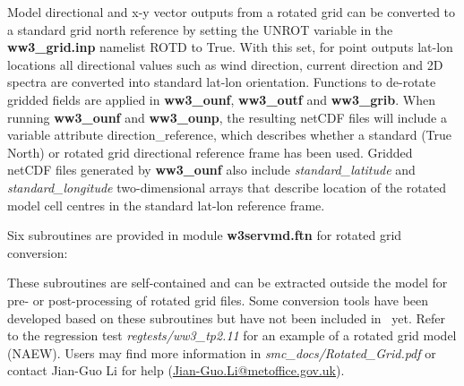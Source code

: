 Model directional and x-y vector outputs from a rotated grid can be converted
to a standard grid north reference by setting the UNROT variable in the
{\bf ww3\_grid.inp} namelist ROTD to True. With this set, for point outputs
lat-lon locations all directional
values such as wind direction, current direction and 2D spectra are converted
into standard lat-lon orientation. Functions to de-rotate gridded
fields are applied in {\bf ww3\_ounf}, {\bf ww3\_outf} and {\bf ww3\_grib}. 
When running {\bf ww3\_ounf} and {\bf ww3\_ounp}, the resulting netCDF
files will include a variable attribute direction\_reference, which describes
whether a standard (True North) or rotated grid directional reference frame
has been used. Gridded netCDF files generated by {\bf ww3\_ounf} also include
\emph{standard\_latitude} and \emph{standard\_longitude} two-dimensional arrays
that describe location of the rotated model cell centres in the standard lat-lon
reference frame. 

Six subroutines are provided in module {\bf w3servmd.ftn} for rotated grid
conversion:
\begin{vlist}
\end{vlist}
These subroutines are self-contained and can be extracted outside the model
for pre- or post-processing of rotated grid files.  Some conversion tools have
been developed based on these subroutines but have not been included in \ws\
yet. Refer to the regression test \emph{regtests/ww3\_tp2.11} for an example
of a rotated grid model (NAEW).  Users may find more information in
\emph{smc\_docs/Rotated\_Grid.pdf} or contact Jian-Guo Li for help
(\url{Jian-Guo.Li@metoffice.gov.uk}).
